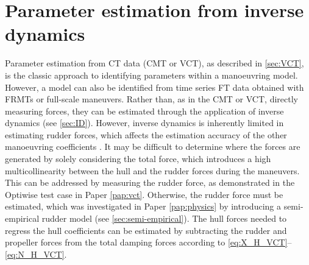 \section{Parameter estimation from inverse dynamics} \label{sec:IDR}
Parameter estimation from CT data (CMT or VCT), as described in \autoref{sec:VCT}, is the classic approach to identifying parameters within a manoeuvring model. However, a model can also be identified from time series FT data obtained with FRMTs or full-scale maneuvers. Rather than, as in the CMT or VCT, directly measuring forces, they can be estimated through the application of inverse dynamics (see \autoref{sec:ID}). However, inverse dynamics is inherently limited in estimating rudder forces, which affects the estimation accuracy of the other manoeuvring coefficients \cite{arakiEstimatingManeuveringCoefficients2012}. It may be difficult to determine where the forces are generated by solely considering the total force, which introduces a high multicollinearity between the hull and the rudder forces during the maneuvers.
This can be addressed by measuring the rudder force, as demonstrated in the Optiwise test case in Paper \ref{pap:vct}. Otherwise, the rudder force must be estimated, which was investigated in Paper \ref{pap:physics} by introducing a semi-empirical rudder model (see \autoref{sec:semi-empirical}). The hull forces needed to regress the hull coefficients can be estimated by subtracting the rudder and propeller forces from the total damping forces according to \autoref{eq:X_H_VCT}--\autoref{eq:N_H_VCT}.



